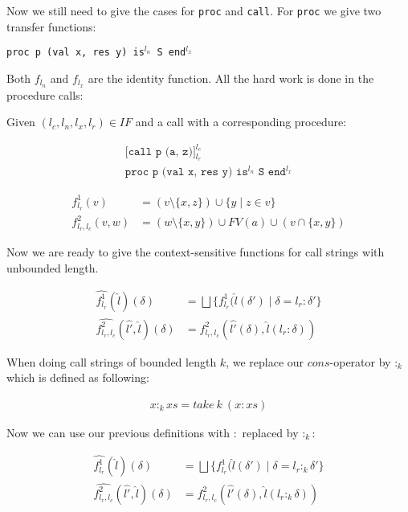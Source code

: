 \documentclass[a4wide,12pt]{article}
\theoremstyle{definition}
\theoremstyle{plain}
\theoremstyle{remark}
\begin{document}
Now we still need to give the cases for \texttt{proc} and \texttt{call}. For
\texttt{proc} we give two transfer functions:

\texttt{proc p (val x, res y) is$^{l_n}$ S end$^{l_x}$}

Both $f_{l_n}$ and $f_{l_x}$ are the identity function. All the hard work is
done in the procedure calls:

Given $(l_c, l_n, l_x, l_r) \in IF$ and a call with a corresponding
procedure:

\begin{align}
\texttt{[call p (a, z)]$^{l_c}_{l_r}$}\\
\texttt{proc p (val x, res y) is$^{l_n}$ S end$^{l_x}$}
\end{align}
 
\begin{align}
f^1_{l_r} (v) & = (v \setminus \{x, z\}) \cup \{y \mid z \in v\} \\
f^2_{l_r, l_c} (v, w) & = (w \setminus \{x, y\}) \cup FV(a) \cup (v \cap \{x, y\})
\end{align}

Now we are ready to give the context-sensitive functions for call strings with
unbounded length.

\begin{align}
\widehat{f^1_{l_r}} (\widehat{l}) (\delta) & = \bigsqcup \{ f^1_{l_r} (\widehat{l}(\delta') \mid \delta = l_r : \delta' \} \\
\widehat{f^2_{l_r, l_c}} (\widehat{l'}, \widehat{l}) (\delta) & = f^2_{l_r, l_c} (\widehat{l'}(\delta), \widehat{l}(l_r : \delta))
\end{align}

When doing call strings of bounded length $k$, we replace our $cons$-operator by
$:_k$ which is defined as following:

\begin{align}
x :_k xs = take\ k\ (x : xs)
\end{align}

Now we can use our previous definitions with $:$ replaced by $:_k$:

\begin{align}
\widehat{f^1_{l_r}} (\widehat{l}) (\delta) & = \bigsqcup \{ f^1_{l_r} (\widehat{l}(\delta') \mid \delta = l_r :_k \delta' \} \\
\widehat{f^2_{l_r, l_c}} (\widehat{l'}, \widehat{l}) (\delta) & = f^2_{l_r, l_c} (\widehat{l'}(\delta), \widehat{l}(l_r :_k \delta))
\end{align}
\end{document}
